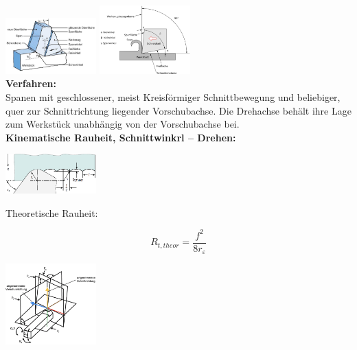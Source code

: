\includegraphics[width=35mm]{src/images/Zerspanvorgang1.png}
\includegraphics[width= 35mm]{src/images/Zerspanvorgang2.png}\\
\textbf{Verfahren:}\\
Spanen mit geschlossener, meist Kreisförmiger Schnittbewegung 
und beliebiger, quer zur Schnittrichtung liegender Vorschubachse. 
Die Drehachse behält ihre Lage zum Werkstück unabhängig von 
der Vorschubachse bei. \\

\textbf{Kinematische Rauheit, Schnittwinkrl – Drehen:}\\

\begin{minipage}{0.48\linewidth}
    \includegraphics[width=35mm]{src/images/Kinematische Rauheit.jpeg}
    \begin{tiny}
    Theoretische Rauheit:\\ 
    \begin{center}
        \[
            \boxed{        
                R_{t,theor} = \frac{f^2}{8 r_{\varepsilon}}
                }
            \]
    \end{center}
    \end{tiny}
\end{minipage}
\begin{minipage}{0.48\linewidth}
    \includegraphics[width=35mm]{src/images/Winkel Drehen.png}\\
\end{minipage}
\\


